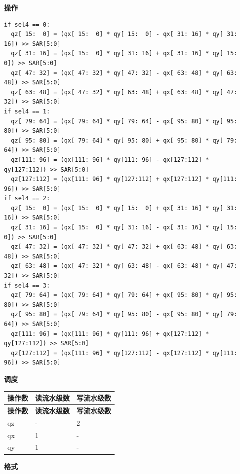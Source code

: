 \textbf{操作}\\
\begin{lstlisting}
if sel4 == 0:
  qz[ 15:  0] = (qx[ 15:  0] * qy[ 15:  0] - qx[ 31: 16] * qy[ 31: 16]) >> SAR[5:0]
  qz[ 31: 16] = (qx[ 15:  0] * qy[ 31: 16] + qx[ 31: 16] * qy[ 15:  0]) >> SAR[5:0]
  qz[ 47: 32] = (qx[ 47: 32] * qy[ 47: 32] - qx[ 63: 48] * qy[ 63: 48]) >> SAR[5:0]
  qz[ 63: 48] = (qx[ 47: 32] * qy[ 63: 48] + qx[ 63: 48] * qy[ 47: 32]) >> SAR[5:0]
if sel4 == 1:
  qz[ 79: 64] = (qx[ 79: 64] * qy[ 79: 64] - qx[ 95: 80] * qy[ 95: 80]) >> SAR[5:0]
  qz[ 95: 80] = (qx[ 79: 64] * qy[ 95: 80] + qx[ 95: 80] * qy[ 79: 64]) >> SAR[5:0]
  qz[111: 96] = (qx[111: 96] * qy[111: 96] - qx[127:112] * qy[127:112]) >> SAR[5:0]
  qz[127:112] = (qx[111: 96] * qy[127:112] + qx[127:112] * qy[111: 96]) >> SAR[5:0]
if sel4 == 2:
  qz[ 15:  0] = (qx[ 15:  0] * qy[ 15:  0] + qx[ 31: 16] * qy[ 31: 16]) >> SAR[5:0]
  qz[ 31: 16] = (qx[ 15:  0] * qy[ 31: 16] - qx[ 31: 16] * qy[ 15:  0]) >> SAR[5:0]
  qz[ 47: 32] = (qx[ 47: 32] * qy[ 47: 32] + qx[ 63: 48] * qy[ 63: 48]) >> SAR[5:0]
  qz[ 63: 48] = (qx[ 47: 32] * qy[ 63: 48] - qx[ 63: 48] * qy[ 47: 32]) >> SAR[5:0]
if sel4 == 3:
  qz[ 79: 64] = (qx[ 79: 64] * qy[ 79: 64] + qx[ 95: 80] * qy[ 95: 80]) >> SAR[5:0]
  qz[ 95: 80] = (qx[ 79: 64] * qy[ 95: 80] - qx[ 95: 80] * qy[ 79: 64]) >> SAR[5:0]
  qz[111: 96] = (qx[111: 96] * qy[111: 96] + qx[127:112] * qy[127:112]) >> SAR[5:0]
  qz[127:112] = (qx[111: 96] * qy[127:112] - qx[127:112] * qy[111: 96]) >> SAR[5:0]
\end{lstlisting}



\textbf{调度}\\
\begin{longtable}[c]{|l|l|l|}
    \hline
    \rowcolor{lightgray}
    \textbf{操作数} & \textbf{读流水级数} & \textbf{写流水级数} \\\hline
    \endfirsthead
    \hline
    \rowcolor{lightgray}
     \textbf{操作数} & \textbf{读流水级数} & \textbf{写流水级数} \\\hline
    \endhead
    \hline
    \endfoot


    qz & - & 2 \\\hline
     qx & 1 & - \\\hline
     qy & 1 & -

\end{longtable}

\textbf{格式}\\


